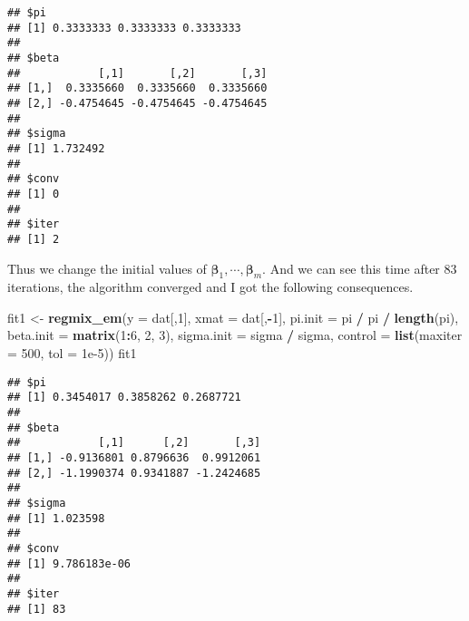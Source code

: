 \documentclass[]{book}
\newenvironment{Shaded}{\begin{snugshade}}{\end{snugshade}}
\newcommand{\KeywordTok}[1]{\textcolor[rgb]{0.13,0.29,0.53}{\textbf{#1}}}
\newcommand{\DataTypeTok}[1]{\textcolor[rgb]{0.13,0.29,0.53}{#1}}
\newcommand{\DecValTok}[1]{\textcolor[rgb]{0.00,0.00,0.81}{#1}}
\newcommand{\FloatTok}[1]{\textcolor[rgb]{0.00,0.00,0.81}{#1}}
\newcommand{\StringTok}[1]{\textcolor[rgb]{0.31,0.60,0.02}{#1}}
\newcommand{\OperatorTok}[1]{\textcolor[rgb]{0.81,0.36,0.00}{\textbf{#1}}}
\newcommand{\NormalTok}[1]{#1}
\theoremstyle{definition}
\theoremstyle{definition}
\theoremstyle{definition}
\theoremstyle{remark}
\begin{document}
\begin{verbatim}
## $pi
## [1] 0.3333333 0.3333333 0.3333333
## 
## $beta
##            [,1]       [,2]       [,3]
## [1,]  0.3335660  0.3335660  0.3335660
## [2,] -0.4754645 -0.4754645 -0.4754645
## 
## $sigma
## [1] 1.732492
## 
## $conv
## [1] 0
## 
## $iter
## [1] 2
\end{verbatim}

Thus we change the initial values of
\(\boldsymbol{\beta}_{1},\cdots,\boldsymbol{\beta}_{m}\). And we can see
this time after \(83\) iterations, the algorithm converged and I got the
following consequences.

\begin{Shaded}
\begin{Highlighting}[]
\NormalTok{fit1 <-}\StringTok{ }\KeywordTok{regmix_em}\NormalTok{(}\DataTypeTok{y =}\NormalTok{ dat[,}\DecValTok{1}\NormalTok{], }\DataTypeTok{xmat =}\NormalTok{ dat[,}\OperatorTok{-}\DecValTok{1}\NormalTok{],}
          \DataTypeTok{pi.init =}\NormalTok{ pi }\OperatorTok{/}\StringTok{ }\NormalTok{pi }\OperatorTok{/}\StringTok{ }\KeywordTok{length}\NormalTok{(pi),}
          \DataTypeTok{beta.init =} \KeywordTok{matrix}\NormalTok{(}\DecValTok{1}\OperatorTok{:}\DecValTok{6}\NormalTok{, }\DecValTok{2}\NormalTok{, }\DecValTok{3}\NormalTok{),}
          \DataTypeTok{sigma.init =}\NormalTok{ sigma }\OperatorTok{/}\StringTok{ }\NormalTok{sigma,}
          \DataTypeTok{control =} \KeywordTok{list}\NormalTok{(}\DataTypeTok{maxiter =} \DecValTok{500}\NormalTok{, }\DataTypeTok{tol =} \FloatTok{1e-5}\NormalTok{))}
\NormalTok{fit1}
\end{Highlighting}
\end{Shaded}

\begin{verbatim}
## $pi
## [1] 0.3454017 0.3858262 0.2687721
## 
## $beta
##            [,1]      [,2]       [,3]
## [1,] -0.9136801 0.8796636  0.9912061
## [2,] -1.1990374 0.9341887 -1.2424685
## 
## $sigma
## [1] 1.023598
## 
## $conv
## [1] 9.786183e-06
## 
## $iter
## [1] 83
\end{verbatim}


\end{document}

